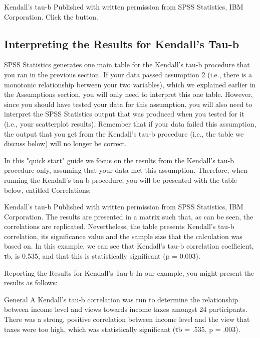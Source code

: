 \documentclass[]{article}
\begin{document}
Kendall's tau-b
Published with written permission from SPSS Statistics, IBM Corporation.
Click the  button.

\subsection{Interpreting the Results for Kendall's Tau-b}
SPSS Statistics generates one main table for the Kendall's tau-b procedure that you ran in the previous section. If your data passed assumption 2 (i.e., there is a monotonic relationship between your two variables), which we explained earlier in the Assumptions section, you will only need to interpret this one table. However, since you should have tested your data for this assumption, you will also need to interpret the SPSS Statistics output that was produced when you tested for it (i.e., your scatterplot results). Remember that if your data failed this assumption, the output that you get from the Kendall's tau-b procedure (i.e., the table we discuss below) will no longer be correct.

In this "quick start" guide we focus on the results from the Kendall's tau-b procedure only, assuming that your data met this assumption. Therefore, when running the Kendall's tau-b procedure, you will be presented with the table below, entitled Correlations:

Kendall's tau-b
Published with written permission from SPSS Statistics, IBM Corporation.
The results are presented in a matrix such that, as can be seen, the correlations are replicated. Nevertheless, the table presents Kendall's tau-b correlation, its significance value and the sample size that the calculation was based on. In this example, we can see that Kendall's tau-b correlation coefficient, τb, is 0.535, and that this is statistically significant (p = 0.003).

Reporting the Results for Kendall's Tau-b
In our example, you might present the results as follows:

General
A Kendall's tau-b correlation was run to determine the relationship between income level and views towards income taxes amongst 24 participants. There was a strong, positive correlation between income level and the view that taxes were too high, which was statistically significant (τb = .535, p = .003).
\end{document}
